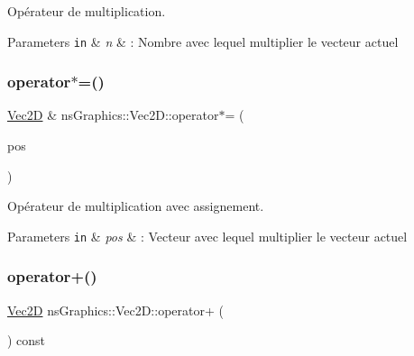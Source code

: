 Opérateur de multiplication. 


\begin{DoxyParams}[1]{Parameters}
\mbox{\tt in}  & {\em n} & \+: Nombre avec lequel multiplier le vecteur actuel \\
\hline
\end{DoxyParams}
\mbox{\label{classns_graphics_1_1_vec2_d_a6e0e661361c0f3081fa2d9488978771e}} 
\subsubsection{\texorpdfstring{operator$\ast$=()}{operator*=()}}
{\footnotesize\ttfamily \hyperlink{classns_graphics_1_1_vec2_d}{Vec2D} \& ns\+Graphics\+::\+Vec2\+D\+::operator$\ast$= (\begin{DoxyParamCaption}\item[{const \hyperlink{classns_graphics_1_1_vec2_d}{Vec2D} \&}]{pos }\end{DoxyParamCaption})}



Opérateur de multiplication avec assignement. 


\begin{DoxyParams}[1]{Parameters}
\mbox{\tt in}  & {\em pos} & \+: Vecteur avec lequel multiplier le vecteur actuel \\
\hline
\end{DoxyParams}
\mbox{\label{classns_graphics_1_1_vec2_d_aded521aea98ae5b1fdd19f4f9e2df74a}} 
\subsubsection{\texorpdfstring{operator+()}{operator+()}\hspace{0.1cm}{\footnotesize\ttfamily [1/2]}}
{\footnotesize\ttfamily \hyperlink{classns_graphics_1_1_vec2_d}{Vec2D} ns\+Graphics\+::\+Vec2\+D\+::operator+ (\begin{DoxyParamCaption}{ }\end{DoxyParamCaption}) const}



